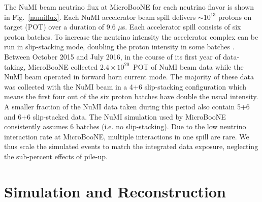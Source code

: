 \documentclass[%
 reprint,
 twocolumn,
superscriptaddress,
showpacs,preprintnumbers,
 amsmath,amssymb,
 aps,
prd,
longbibliography
]{revtex4-1}
\begin{document}
The NuMI beam neutrino flux at MicroBooNE for each neutrino flavor is shown in Fig.~\ref{numiflux}. Each NuMI accelerator beam spill delivers $\sim10^{13}$ protons on target (POT) over a duration of 9.6 $\mu$s. Each accelerator spill consists of six proton batches. To increase the neutrino intensity the accelerator complex can be run in slip-stacking mode, doubling the proton intensity in some batches \cite{Brown:2013idd}. Between October 2015 and July 2016, in the course of its first year of data-taking, MicroBooNE collected $2.4\!\times\!10^{20}$~POT of NuMI beam data while the NuMI beam operated in forward horn current mode. The majority of these data was collected with the NuMI beam in a 4+6 slip-stacking configuration which means the first four out of the six proton batches have double the usual intensity. A smaller fraction of the NuMI data taken during this period also contain 5+6 and 6+6 slip-stacked data. The NuMI simulation used by MicroBooNE consistently assumes 6 batches (i.e. no slip-stacking). Due to the low neutrino interaction rate at MicroBooNE, multiple interactions in one spill are rare. We thus scale the simulated events to match the integrated data exposure, neglecting the sub-percent effects of pile-up.

\section{Simulation and Reconstruction} \label{sec:sim_and_reco}
\end{document}

